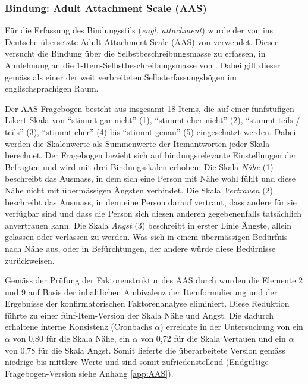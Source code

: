 \subsubsection{Bindung: Adult Attachment Scale (AAS)}\label{sec:AAS}
Für die Erfassung des Bindungsstils (\textit{engl. attachment}) wurde der von  ins Deutsche übersetzte Adult Attachment Scale (AAS) von  verwendet. Dieser versucht die Bindung über die Selbst\-beschreibungs\-masse zu erfassen, in Ahnlehnung an die 1-Item-Selbst\-beschreibungs\-masse von . Dabei gilt dieser gemäss  als einer der weit verbreiteten Selbst\-er\-fassungs\-bögen im englisch\-sprachigen Raum.

Der AAS Fragebogen besteht aus insgesamt 18 Items, die auf einer fünfstufigen Likert-Skala von \enquote{stimmt gar nicht} (1), \enquote{stimmt eher nicht} (2), \enquote{stimmt teils / teils} (3), \enquote{stimmt eher} (4) bis \enquote{stimmt genau} (5) eingeschätzt werden. Dabei werden die Skalenwerte als Summenwerte der Itemantworten jeder Skala berechnet. Der Fragebogen bezieht sich auf bindungsrelevante Einstellungen der Befragten und wird mit drei Bindungsskalen erhoben: Die Skala \textit{Nähe} (1) beschreibt das Ausmass, in dem sich eine Person mit Nähe wohl fühlt und diese Nähe nicht mit übermässigen Ängsten verbindet. Die Skala \textit{Vertrauen} (2) beschreibt das Ausmass, in dem eine Person darauf vertraut, dass andere für sie verfügbar sind und dass die Person sich diesen anderen gegebenenfalls tatsächlich anvertrauen kann. Die Skala \textit{Angst} (3) beschreibt in erster Linie Ängste, allein gelassen oder verlassen zu werden. Was sich in einem übermässigen Bedürfnis nach Nähe aus, oder in Befürchtungen, der andere würde diese Bedürnisse zurückweisen. 

Gemäss der Prüfung der Faktorenstruktur des AAS durch  wurden die Elemente 2 und 9 auf Basis der inhaltlichen Ambivalenz der Itemformulierung und der Ergebnisse der konfirmatorischen Faktorenanalyse eliminiert. Diese Reduktion führte zu einer fünf-Item-Version der Skala Nähe und Angst. Die dadurch erhaltene interne Konsistenz (Cronbachs $\alpha$) erreichte in der Untersuchung von  ein $\alpha$ von 0,80 für die Skala Nähe, ein $\alpha$ von 0,72 für die Skala Vertauen und ein $\alpha$ von 0,78 für die Skala Angst. Somit lieferte die überarbeitete Version gemäss  niedrige bis mittlere Werte und sind somit zufriedenstellend (Endgültige Fragebogen-Version siehe Anhang \ref{app:AAS}).


